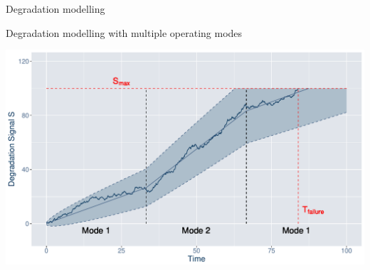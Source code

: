\documentclass[slides]{beamer}
\begin{document}
\appendix
\begin{frame}[allowframebreaks]
    \tiny
    
    
\end{frame}

\begin{frame}{Degradation modelling}
    \centering
    
\end{frame}


\begin{frame}{Degradation modelling with multiple operating modes}
\begin{center}
    \includegraphics[scale=0.42]{example-wiener-om.pdf} \\
\end{center}
\end{frame}
\end{document}
